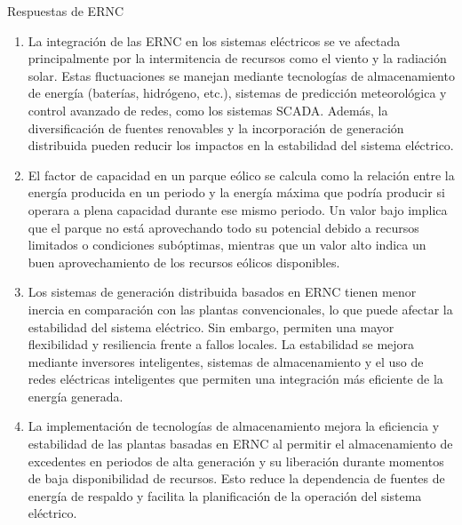 \documentclass[
  11pt,
  letterpaper,
   addpoints,
   answers
  ]{exam}
\begin{document}
\begin{questions}
\begin{solution}
        Respuestas de ERNC

        \begin{enumerate}
            \item La integración de las ERNC en los sistemas eléctricos se ve afectada principalmente por la intermitencia de recursos como el viento y la radiación solar. Estas fluctuaciones se manejan mediante tecnologías de almacenamiento de energía (baterías, hidrógeno, etc.), sistemas de predicción meteorológica y control avanzado de redes, como los sistemas SCADA. Además, la diversificación de fuentes renovables y la incorporación de generación distribuida pueden reducir los impactos en la estabilidad del sistema eléctrico.
        
            \item El factor de capacidad en un parque eólico se calcula como la relación entre la energía producida en un periodo y la energía máxima que podría producir si operara a plena capacidad durante ese mismo periodo. Un valor bajo implica que el parque no está aprovechando todo su potencial debido a recursos limitados o condiciones subóptimas, mientras que un valor alto indica un buen aprovechamiento de los recursos eólicos disponibles.
        
            \item Los sistemas de generación distribuida basados en ERNC tienen menor inercia en comparación con las plantas convencionales, lo que puede afectar la estabilidad del sistema eléctrico. Sin embargo, permiten una mayor flexibilidad y resiliencia frente a fallos locales. La estabilidad se mejora mediante inversores inteligentes, sistemas de almacenamiento y el uso de redes eléctricas inteligentes que permiten una integración más eficiente de la energía generada.
        
            \item La implementación de tecnologías de almacenamiento mejora la eficiencia y estabilidad de las plantas basadas en ERNC al permitir el almacenamiento de excedentes en periodos de alta generación y su liberación durante momentos de baja disponibilidad de recursos. Esto reduce la dependencia de fuentes de energía de respaldo y facilita la planificación de la operación del sistema eléctrico.
        

\end{enumerate}
\end{solution}
\end{questions}
\end{document}
